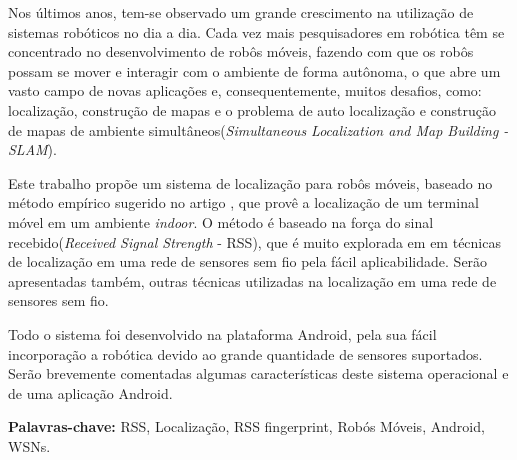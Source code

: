 	Nos últimos anos, tem-se observado um grande crescimento na utilização de sistemas robóticos no dia a dia.
	Cada vez mais pesquisadores em robótica têm se concentrado no desenvolvimento de robôs móveis, fazendo com que os
	 robôs possam se mover e interagir com o ambiente de forma autônoma, 
	o que abre um vasto campo de novas aplicações e, consequentemente, muitos desafios, como:  localização, construção de mapas e o problema
	de auto localização e construção 
  de mapas de ambiente simultâneos(\textit{Simultaneous Localization and Map Building - SLAM}). 
		
    Este trabalho propõe um sistema de localização para robôs móveis, 
    baseado no método empírico sugerido no artigo \cite{wifiRadar},
    que provê a localização de um terminal móvel em um ambiente \textit{indoor}. 
    O método é baseado na força do 
    sinal recebido(\textit{Received Signal Strength} - RSS), que é muito explorada em
    em técnicas de localização em uma rede de sensores sem fio pela fácil aplicabilidade. Serão apresentadas também, outras 
    técnicas utilizadas na localização em uma rede de sensores sem fio.
  
	Todo o sistema foi desenvolvido na plataforma Android, pela sua fácil incorporação a robótica devido ao 
	grande quantidade de sensores suportados. Serão brevemente comentadas
	algumas características deste sistema operacional e de uma aplicação Android.
   
\textbf{Palavras-chave:} RSS, Localização, RSS fingerprint, Robós Móveis, Android, WSNs.
